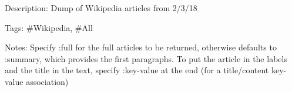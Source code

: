Description\+: Dump of Wikipedia articles from 2/3/18

Tags\+: \#\+Wikipedia, \#\+All

Notes\+: Specify \textquotesingle{}\+:full\textquotesingle{} for the full articles to be returned, otherwise defaults to \textquotesingle{}\+:summary\textquotesingle{}, which provides the first paragraphs. To put the article in the labels and the title in the text, specify \textquotesingle{}\+:key-\/value\textquotesingle{} at the end (for a title/content key-\/value association) 